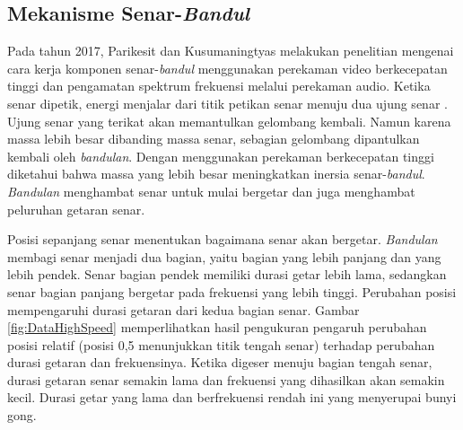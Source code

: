 \subsection{Mekanisme Senar-\textit{Bandul}}
Pada tahun 2017, Parikesit dan Kusumaningtyas melakukan penelitian mengenai cara kerja komponen senar-\textit{bandul} menggunakan perekaman video berkecepatan tinggi dan pengamatan spektrum frekuensi melalui perekaman audio. Ketika senar dipetik, energi menjalar dari titik petikan senar menuju dua ujung senar \cite{bukuFletcher}. Ujung senar yang terikat akan memantulkan gelombang kembali. Namun karena massa \bandulan lebih besar dibanding massa senar, sebagian gelombang dipantulkan kembali oleh \textit{bandulan}. Dengan menggunakan perekaman berkecepatan tinggi diketahui bahwa massa \bandulan yang lebih besar meningkatkan inersia senar-\textit{bandul}. \textit{Bandulan} menghambat senar untuk mulai bergetar dan juga menghambat peluruhan getaran senar. \par 
Posisi \bandulan sepanjang senar menentukan bagaimana senar akan bergetar. \textit{Bandulan} membagi senar menjadi dua bagian, yaitu bagian yang lebih panjang dan yang lebih pendek. Senar bagian pendek memiliki durasi getar lebih lama, sedangkan senar bagian panjang bergetar pada frekuensi yang lebih tinggi. Perubahan posisi \bandulan mempengaruhi durasi getaran dari kedua bagian senar. Gambar \ref{fig:DataHighSpeed} memperlihatkan hasil pengukuran pengaruh perubahan posisi relatif \bandulan (posisi 0,5 menunjukkan titik tengah senar) terhadap perubahan durasi getaran dan frekuensinya. Ketika \bandulan digeser menuju bagian tengah senar, durasi getaran senar semakin lama dan frekuensi yang dihasilkan akan semakin kecil. Durasi getar yang lama dan berfrekuensi rendah ini yang menyerupai bunyi gong. \par 
